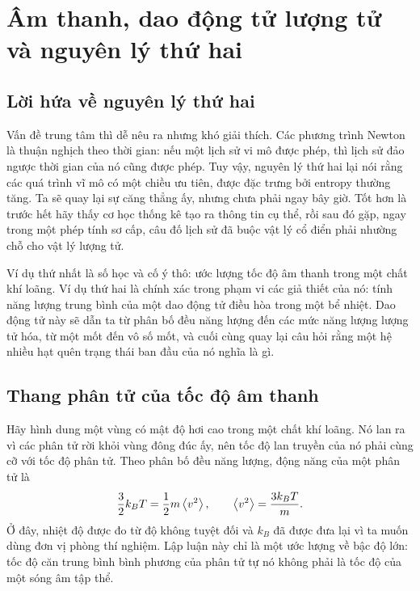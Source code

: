 \chapter{Âm thanh, dao động tử lượng tử và nguyên lý thứ hai}


\section{Lời hứa về nguyên lý thứ hai}

Vấn đề trung tâm thì dễ nêu ra nhưng khó giải thích. Các phương trình Newton là thuận nghịch theo thời gian: nếu một lịch sử vi mô được phép, thì lịch sử đảo ngược thời gian của nó cũng được phép. Tuy vậy, nguyên lý thứ hai lại nói rằng các quá trình vĩ mô có một chiều ưu tiên, được đặc trưng bởi entropy thường tăng. Ta sẽ quay lại sự căng thẳng ấy, nhưng chưa phải ngay bây giờ. Tốt hơn là trước hết hãy thấy cơ học thống kê tạo ra thông tin cụ thể, rồi sau đó gặp, ngay trong một phép tính sơ cấp, câu đố lịch sử đã buộc vật lý cổ điển phải nhường chỗ cho vật lý lượng tử.

Ví dụ thứ nhất là số học và cố ý thô: ước lượng tốc độ âm thanh trong một chất khí loãng. Ví dụ thứ hai là chính xác trong phạm vi các giả thiết của nó: tính năng lượng trung bình của một dao động tử điều hòa trong một bể nhiệt. Dao động tử này sẽ dẫn ta từ phân bố đều năng lượng đến các mức năng lượng lượng tử hóa, từ một mốt đến vô số mốt, và cuối cùng quay lại câu hỏi rằng một hệ nhiều hạt quên trạng thái ban đầu của nó nghĩa là gì.

\section{Thang phân tử của tốc độ âm thanh}

Hãy hình dung một vùng có mật độ hơi cao trong một chất khí loãng. Nó lan ra vì các phân tử rời khỏi vùng đông đúc ấy, nên tốc độ lan truyền của nó phải cùng cỡ với tốc độ phân tử. Theo phân bố đều năng lượng, động năng của một phân tử là \begin{equation}
 \frac{3}{2}k_B T
 =\frac{1}{2}m\left\langle v^2\right\rangle,
 \qquad
 \left\langle v^2\right\rangle=\frac{3k_B T}{m}.
 \label{eq:sm7-molecular-speed}
\end{equation} Ở đây, nhiệt độ được đo từ độ không tuyệt đối và \(k_B\) đã được đưa lại vì ta muốn dùng đơn vị phòng thí nghiệm. Lập luận này chỉ là một ước lượng về bậc độ lớn: tốc độ căn trung bình bình phương của phân tử tự nó không phải là tốc độ của một sóng âm tập thể.

